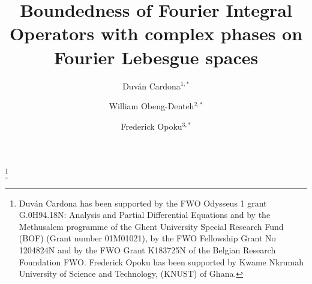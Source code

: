 \documentclass[12pt, reqno]{amsart}
\theoremstyle{definition}
\theoremstyle{remark}
\numberwithin{equation}{section}
\begin{document}
\setcounter{page}{1}

\color{darkgray}{
\noindent \centering
{\small   }\hfill    {\small }\\
{\small }\hfill  {\small }}

\centerline{}

\centerline{}



\title[Boundedness of Fourier Integral Operators with complex phases]{Boundedness of Fourier Integral Operators with complex phases on Fourier Lebesgue spaces}

\author[D. Cardona]{Duv\'an Cardona$^{1,*}$}
\address{
  Duv\'an Cardona:
  \endgraf
  Department of Mathematics: Analysis, Logic and Discrete Mathematics
  \endgraf
  Ghent University, Belgium
  \endgraf
  {\it E-mail address} {\rm duvanc306@gmail.com, duvan.cardonasanchez@ugent.be}
  }

\author[W.O. Denteh]{William Obeng-Denteh$^{2,*}$}
\address{
  William Obeng-Denteh
  \endgraf
  Department of Mathematics
  \endgraf
  Kwame Nkrumah University of Science and Technology, (KNUST)- Ghana.
  \endgraf
  {\it E-mail address} {\rm wobengdenteh@gmail.com}
  }



\author[F. Opoku]{Frederick Opoku$^{3,*}$}
\address{
  Frederick Opoku
  \endgraf
  Department of Mathematics
  \endgraf
  Kwame Nkrumah University of Science and Technology, (KNUST)- Ghana.
  \endgraf
  {\it E-mail address} {\rm frederick@aims.edu.gh}
  }


\thanks{Duv\'an Cardona has been  supported  by the FWO  Odysseus  1  grant  G.0H94.18N:  Analysis  and  Partial Differential Equations and by the Methusalem programme of the Ghent University Special Research Fund (BOF)
(Grant number 01M01021), by the FWO Fellowship
Grant No 1204824N and by the FWO Grant K183725N of the Belgian Research Foundation FWO. Frederick Opoku has been supported by Kwame Nkrumah University of Science and Technology, (KNUST) of Ghana.
}
\end{document}
